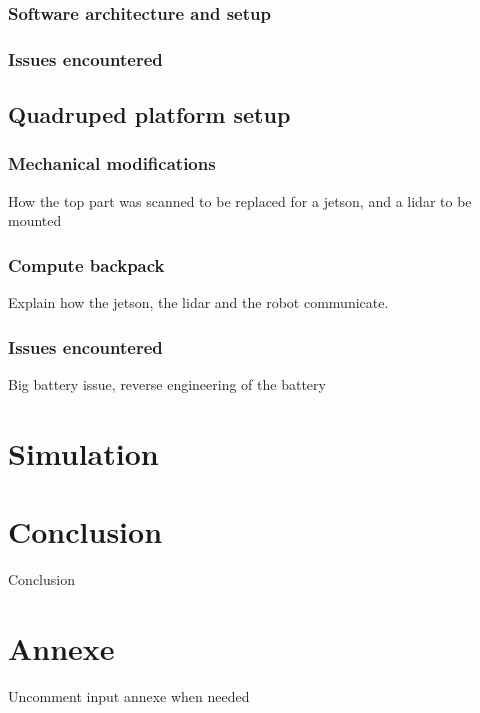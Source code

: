 \documentclass[11pt]{article}
\begin{document}
                \subsubsection{Software architecture and setup}
    
            
                \subsubsection{Issues encountered}
                
                \subsection{Quadruped platform setup}


                \subsubsection{Mechanical modifications}

                How the top part was scanned to be replaced for a jetson, and a lidar to be mounted

                \subsubsection{Compute backpack}

                Explain how the jetson, the lidar and the robot communicate.

                \subsubsection{Issues encountered}

                Big battery issue, reverse engineering of the battery

        \newpage

    \section{Simulation}

    \section{Conclusion}

        Conclusion     

    \newpage

    \newpage
    \printnoidxglossaries %

    \newpage
    \listoffigures


    \newpage
    \section*{Annexe}
    Uncomment input annexe when needed



    
\end{document}
